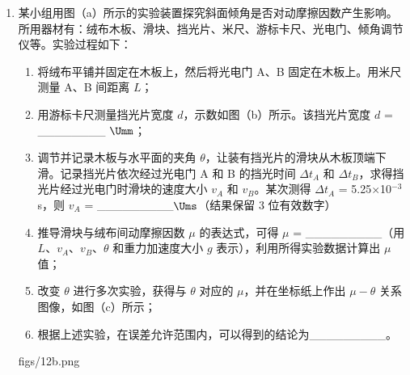 \documentclass[\gkver]{gaokaozhenti}
\begin{document}
\begin{enumerate}
\item
某小组用图（a）所示的实验装置探究斜面倾角是否对动摩擦因数产生影响。所用器材有：绒布木板、滑块、挡光片、米尺、游标卡尺、光电门、倾角调节仪等。实验过程如下：
\begin{enumerate}
	\item
	将绒布平铺并固定在木板上，然后将光电门 A、B 固定在木板上。用米尺测量 A、B 间距离 $L$；
	\item
	用游标卡尺测量挡光片宽度 $d$，示数如图（b）所示。该挡光片宽度 $d$ = \_\_\_\_\_\_\_\_ $\Umm$；
	\item
	调节并记录木板与水平面的夹角 $\theta$，让装有挡光片的滑块从木板顶端下滑。记录挡光片依次经过光电门 A 和 B 的挡光时间 $\Delta t_{A}$ 和 $\Delta t_{B}$，求得挡光片经过光电门时滑块的速度大小 $v_{A}$ 和 $v_{B}$。某次测得 $\Delta t_{A}$ = 5.25$\times$10$^{-3}$ s，则 $v_{A}$ = \_\_\_\_\_\_\_\_\_$\Ums$（结果保留 3 位有效数字）
	\item
	推导滑块与绒布间动摩擦因数 $\mu$ 的表达式，可得 $\mu$ = \_\_\_\_\_\_\_\_\_（用 $L$、$v_{A}$、$v_{B}$、$\theta$ 和重力加速度大小 $g$ 表示），利用所得实验数据计算出 $\mu$ 值；
	\item
	改变 $\theta$ 进行多次实验，获得与 $\theta$ 对应的 $\mu$，并在坐标纸上作出 $\mu - \theta$ 关系图像，如图（c）所示；
	\item
	根据上述实验，在误差允许范围内，可以得到的结论为\_\_\_\_\_\_\_\_\_。
\end{enumerate}
{figs/12b.png}
\end{enumerate}
\end{document}
